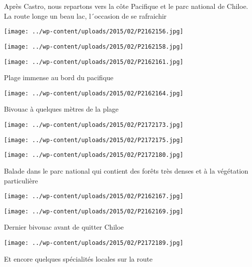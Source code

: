  \newline
 Après Castro, nous repartons vers la côte Pacifique et le parc national de Chiloe. \newline
 La route longe un beau lac, l´occasion de se rafraichir \newline
 \newline
\centerline{\texttt{[image: ../wp-content/uploads/2015/02/P2162156.jpg]} } 
 \newline
 \newline
\centerline{\texttt{[image: ../wp-content/uploads/2015/02/P2162158.jpg]} } 
 \newline
 \newline
\centerline{\texttt{[image: ../wp-content/uploads/2015/02/P2162161.jpg]} } 
 \newline
 Plage immense au bord du pacifique \newline
 \newline
\centerline{\texttt{[image: ../wp-content/uploads/2015/02/P2162164.jpg]} } 
 \newline
 Bivouac à quelques mètres de la plage \newline
 \newline
\centerline{\texttt{[image: ../wp-content/uploads/2015/02/P2172173.jpg]} } 
 \newline
 \newline
\centerline{\texttt{[image: ../wp-content/uploads/2015/02/P2172175.jpg]} } 
 \newline
 \newline
\centerline{\texttt{[image: ../wp-content/uploads/2015/02/P2172180.jpg]} } 
 \newline
 Balade dans le parc national qui contient des forêts très denses et à la végétation particulière \newline
 \newline
\centerline{\texttt{[image: ../wp-content/uploads/2015/02/P2162167.jpg]} } 
 \newline
 \newline
\centerline{\texttt{[image: ../wp-content/uploads/2015/02/P2162169.jpg]} } 
 \newline
 Dernier bivouac avant de quitter Chiloe \newline
 \newline
\centerline{\texttt{[image: ../wp-content/uploads/2015/02/P2172189.jpg]} } 
 \newline
 Et encore quelques spécialités locales sur la route \newline
